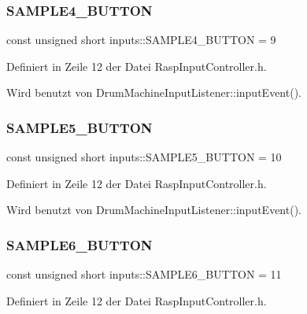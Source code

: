 \subsubsection{\texorpdfstring{S\+A\+M\+P\+L\+E4\+\_\+\+B\+U\+T\+T\+ON}{SAMPLE4\_BUTTON}}
{\footnotesize\ttfamily const unsigned short inputs\+::\+S\+A\+M\+P\+L\+E4\+\_\+\+B\+U\+T\+T\+ON = 9}



Definiert in Zeile 12 der Datei Rasp\+Input\+Controller.\+h.



Wird benutzt von Drum\+Machine\+Input\+Listener\+::input\+Event().

\mbox{\label{namespaceinputs_ad22ade847b4a38fd418dccda07814551}} 
\subsubsection{\texorpdfstring{S\+A\+M\+P\+L\+E5\+\_\+\+B\+U\+T\+T\+ON}{SAMPLE5\_BUTTON}}
{\footnotesize\ttfamily const unsigned short inputs\+::\+S\+A\+M\+P\+L\+E5\+\_\+\+B\+U\+T\+T\+ON = 10}



Definiert in Zeile 12 der Datei Rasp\+Input\+Controller.\+h.



Wird benutzt von Drum\+Machine\+Input\+Listener\+::input\+Event().

\mbox{\label{namespaceinputs_a88edcfa8b89df1abcca33bcec05974c4}} 
\subsubsection{\texorpdfstring{S\+A\+M\+P\+L\+E6\+\_\+\+B\+U\+T\+T\+ON}{SAMPLE6\_BUTTON}}
{\footnotesize\ttfamily const unsigned short inputs\+::\+S\+A\+M\+P\+L\+E6\+\_\+\+B\+U\+T\+T\+ON = 11}



Definiert in Zeile 12 der Datei Rasp\+Input\+Controller.\+h.



